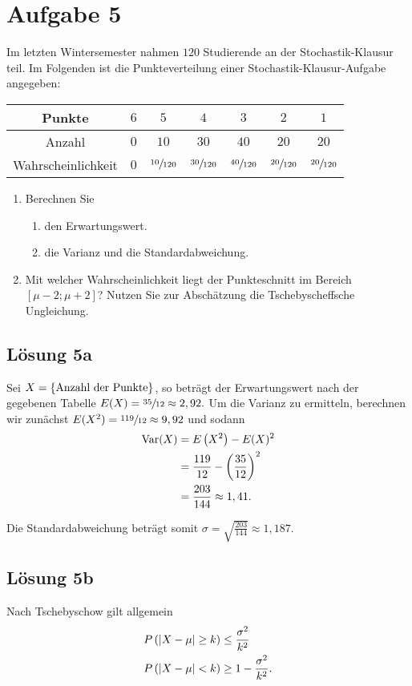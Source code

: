 \documentclass[main.tex]{subfiles}
\begin{document}
\section{Aufgabe 5}
Im letzten Wintersemester nahmen $120$ Studierende an der Stochastik-Klausur teil. Im Folgenden ist die Punkteverteilung einer Stochastik-Klausur-Aufgabe angegeben:
\begin{center}
\begin{tabular}{c|c|c|c|c|c|c}
	Punkte & $6$ & $5$ & $4$ & $3$ & $2$ & $1$ \\ \hline
	Anzahl & $0$ & $10$ & $30$ & $40$ & $20$ & $20$ \\ \hline
	Wahrscheinlichkeit & $0$ & $\sfrac{10}{120}$ & $\sfrac{30}{120}$ & $\sfrac{40}{120}$ & $\sfrac{20}{120}$ & $\sfrac{20}{120}$ \\
\end{tabular}
\end{center}
\begin{enumerate}
\item Berechnen Sie
\begin{enumerate}
	\item den Erwartungswert.
	\item die Varianz und die Standardabweichung.
\end{enumerate}
\item Mit welcher Wahrscheinlichkeit liegt der Punkteschnitt im Bereich $[\mu-2; \mu+2]$? Nutzen Sie zur Abschätzung die Tschebyscheffsche Ungleichung.
\end{enumerate}

\subsection{Lösung 5a}

Sei $X = \set{\text{Anzahl der Punkte}}$, so beträgt der Erwartungswert nach der gegebenen Tabelle $E(X) = \sfrac{35}{12} \approx 2,92.$
Um die Varianz zu ermitteln, berechnen wir zunächst $E(X^2) = \sfrac{119}{12} \approx 9,92$ und sodann $$\begin{aligned}
	\Var (X) &= E\left(X^2\right) - E(X)^2 \\
	&= \frac{119}{12} - \left(\frac{35}{12}\right)^2 \\
	&= \frac{203}{144} \approx 1,41.
\end{aligned}$$

Die Standardabweichung beträgt somit $\sigma = \sqrt{\frac{203}{144}} \approx 1,187.$

\subsection{Lösung 5b}
Nach Tschebyschow gilt allgemein $$\begin{aligned}
	P\left(\abs*{X-\mu} \geq k\right) &\leq \frac{\sigma^2}{k^2} \\
	P\left(\abs*{X-\mu} < k\right) &\geq 1 - \frac{\sigma^2}{k^2}.
\end{aligned}$$
\end{document}

